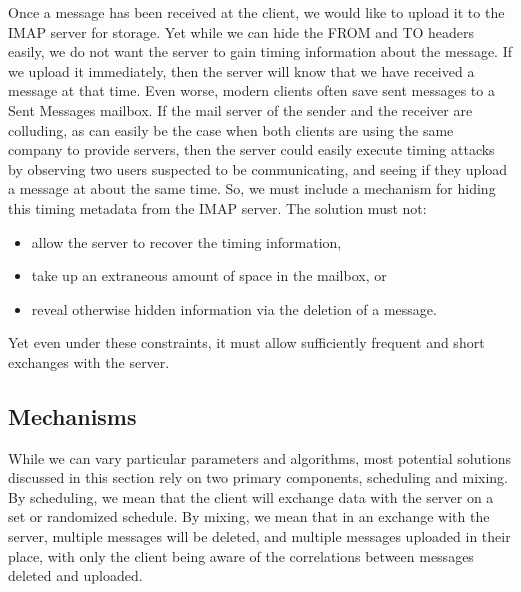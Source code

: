 \documentclass[pageno]{jpaper}
\newcommand{\project}{IMAPSec }
\begin{document}
Once a message has been received at the client, we would like to upload it to the IMAP server for storage. Yet while we can hide the FROM and TO headers easily, we do not want the server to gain timing information about the message. If we upload it immediately, then the server will know that we have received a message at that time. Even worse, modern clients often save sent messages to a Sent Messages mailbox. If the mail server of the sender and the receiver are colluding, as can easily be the case when both clients are using the same company to provide servers, then the server could easily execute timing attacks by observing two users suspected to be communicating, and seeing if they upload a message at about the same time. So, we must include a mechanism for hiding this timing metadata from the IMAP server. The solution must not:

\begin{itemize}
  \item allow the server to recover the timing information,
  \item take up an extraneous amount of space in the mailbox, or
  \item reveal otherwise hidden information via the deletion of a message.
\end{itemize}

Yet even under these constraints, it must allow sufficiently frequent and short exchanges with the server.


\subsection{Mechanisms}

While we can vary particular parameters and algorithms, most potential solutions discussed in this section rely on two primary components, scheduling and mixing. By scheduling, we mean that the client will exchange data with the server on a set or randomized schedule. By mixing, we mean that in an exchange with the server, multiple messages will be deleted, and multiple messages uploaded in their place, with only the client being aware of the correlations between messages deleted and uploaded.

\end{document}

